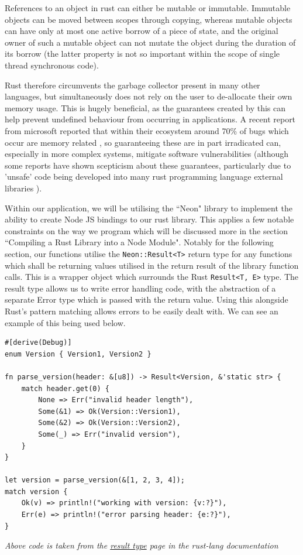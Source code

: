 \documentclass[a4paper,11pt]{article}
\newcommand{\code}[1]{\colorbox{codegray}{\texttt{#1}}}
\begin{document}
References to an object in rust can either be mutable or immutable. Immutable objects can be moved between scopes through copying, whereas mutable objects can have only at most one active borrow of a piece of state, and the original owner of such a mutable object can not mutate the object during the duration of its borrow \citep{rustProgrammingLanguage} (the latter property is not so important within the scope of single thread synchronous code).

Rust therefore circumvents the garbage collector present in many other languages, but simultaneously does not rely on the user to de-allocate their own memory usage. This is hugely beneficial, as the guarantees created by this can help prevent undefined behaviour from occurring in applications. A recent report from microsoft reported that within their ecosystem around 70\% of bugs which occur are memory related \citep{microsoftRustSafety}, so guaranteeing these are in part irradicated can, especially in more complex systems, mitigate software vulnerabilities (although some reports have shown scepticism about these guarantees, particularly due to 'unsafe' code being developed into many rust programming language external libraries \citep{rustbelt}).

Within our application, we will be utilising the ``Neon" \citep{neon} library to implement the ability to create Node JS bindings to our rust library. This applies a few notable constraints on the way we program which will be discussed more in the section ``Compiling a Rust Library into a Node Module". Notably for the following section, our functions utilise the \code{Neon::Result<T>} return type for any functions which shall be returning values utilised in the return result of the library function calls. This is a wrapper object which surrounds the Rust \code{Result<T, E>} type.
The result type allows us to write error handling code, with the abstraction of a separate Error type which is passed with the return value. Using this alongside Rust's pattern matching allows errors to be easily dealt with. We can see an example of this being used below.
\newpage

\begin{verbatim}
#[derive(Debug)]
enum Version { Version1, Version2 }

fn parse_version(header: &[u8]) -> Result<Version, &'static str> {
    match header.get(0) {
        None => Err("invalid header length"),
        Some(&1) => Ok(Version::Version1),
        Some(&2) => Ok(Version::Version2),
        Some(_) => Err("invalid version"),
    }
}

let version = parse_version(&[1, 2, 3, 4]);
match version {
    Ok(v) => println!("working with version: {v:?}"),
    Err(e) => println!("error parsing header: {e:?}"),
}
\end{verbatim}
\begin{center}
\textit{Above code is taken from the \href{https://doc.rust-lang.org/nightly/core/result/index.html}{result type} page in the rust-lang documentation}    
\end{center}
\end{document}
